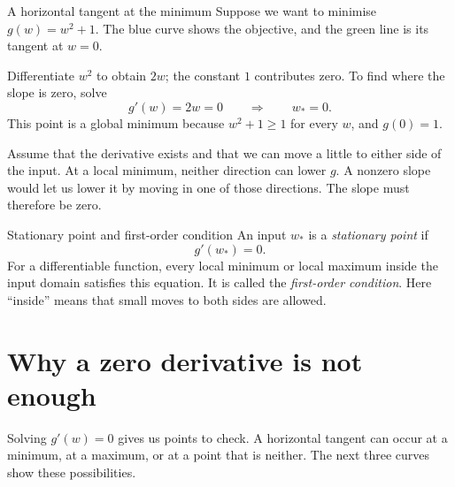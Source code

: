\documentclass[a4paper,12pt,oneside]{report}
\begin{document}
\begin{framedexample}{A horizontal tangent at the minimum}
Suppose we want to minimise $g(w)=w^2+1$. The blue curve shows
the objective, and the green line is its tangent at $w=0$.

\begin{center}
\end{center}

Differentiate $w^2$ to obtain $2w$; the constant $1$ contributes
zero. To find where the slope is zero, solve
\[
  g'(w)=2w=0\qquad\Longrightarrow\qquad w_*=0.
\]
This point is a global minimum because $w^2+1\geq1$ for every $w$,
and $g(0)=1$.
\end{framedexample}

Assume that the derivative exists and that we can move a little
to either side of the input. At a local minimum, neither direction
can lower $g$. A nonzero slope would let us lower it by moving in
one of those directions. The slope must therefore be zero.

\begin{frameddefn}{Stationary point and first-order condition}\label{def:first-order-scalar}
An input $w_*$ is a \emph{stationary point} if
\[
  g'(w_*)=0.
\]
For a differentiable function, every local minimum or local maximum
inside the input domain satisfies this equation. It is called the
\emph{first-order condition}. Here ``inside'' means that small moves
to both sides are allowed.
\end{frameddefn}

\clearpage
\section{Why a zero derivative is not enough}

Solving $g'(w)=0$ gives us points to check. A horizontal tangent
can occur at a minimum, at a maximum, or at a point that is neither.
The next three curves show these possibilities.
\end{document}
